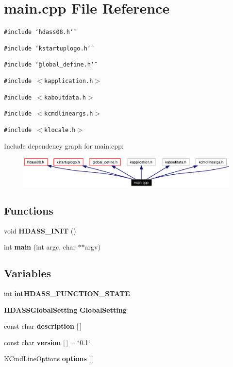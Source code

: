 \section{main.cpp File Reference}
\label{main_8cpp}


{\tt \#include \char`\"{}hdass08.h\char`\"{}}\par
{\tt \#include \char`\"{}kstartuplogo.h\char`\"{}}\par
{\tt \#include \char`\"{}global\_\-define.h\char`\"{}}\par
{\tt \#include $<$kapplication.h$>$}\par
{\tt \#include $<$kaboutdata.h$>$}\par
{\tt \#include $<$kcmdlineargs.h$>$}\par
{\tt \#include $<$klocale.h$>$}\par


Include dependency graph for main.cpp:\begin{figure}[H]
\begin{center}
\leavevmode
\includegraphics[width=331pt]{main_8cpp__incl}
\end{center}
\end{figure}
\subsection*{Functions}
\begin{CompactItemize}
\item 
void {\bf HDASS\_\-INIT} ()
\item 
int {\bf main} (int argc, char $\ast$$\ast$argv)
\end{CompactItemize}
\subsection*{Variables}
\begin{CompactItemize}
\item 
int {\bf int\-HDASS\_\-FUNCTION\_\-STATE}
\item 
{\bf HDASSGlobal\-Setting} {\bf Global\-Setting}
\item 
const char {\bf description} [$\,$]
\item 
const char {\bf version} [$\,$] = \char`\"{}0.1\char`\"{}
\item 
KCmd\-Line\-Options {\bf options} [$\,$]
\end{CompactItemize}


